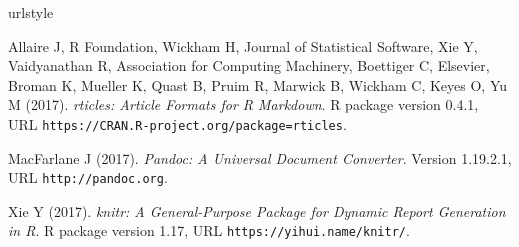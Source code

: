 \documentclass[letterpaper,9pt,twocolumn,twoside,]{pinp}
\begin{document}

\pnasbreak 



\begin{thebibliography}{3}
\newcommand{\enquote}[1]{``#1''}
\providecommand{\natexlab}[1]{#1}
\providecommand{\url}[1]{\texttt{#1}}
\providecommand{\urlprefix}{URL }
\expandafter\ifx\csname urlstyle\endcsname\relax
  \providecommand{\doi}[1]{doi:\discretionary{}{}{}#1}\else
  \providecommand{\doi}{doi:\discretionary{}{}{}\begingroup
  \urlstyle{rm}\Url}\fi
\providecommand{\eprint}[2][]{\url{#2}}

Allaire J, {R Foundation}, Wickham H, {Journal of Statistical Software}, Xie Y,
  Vaidyanathan R, {Association for Computing Machinery}, Boettiger C,
  {Elsevier}, Broman K, Mueller K, Quast B, Pruim R, Marwick B, Wickham C,
  Keyes O, Yu M (2017).
\newblock \emph{rticles: Article Formats for R Markdown}.
\newblock R package version 0.4.1,
  \urlprefix\url{https://CRAN.R-project.org/package=rticles}.

MacFarlane J (2017).
\newblock \emph{Pandoc: A Universal Document Converter}.
\newblock Version 1.19.2.1, \urlprefix\url{http://pandoc.org}.

Xie Y (2017).
\newblock \emph{knitr: A General-Purpose Package for Dynamic Report Generation
  in R}.
\newblock R package version 1.17, \urlprefix\url{https://yihui.name/knitr/}.

\end{thebibliography}
\end{document}

